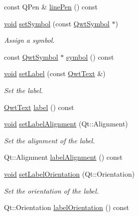 \begin{DoxyCompactItemize}
\item 
const Q\-Pen \& \hyperlink{class_qwt_plot_marker_a744b2aa104fa41d2f09c6658749c2d72}{line\-Pen} () const 
\item 
\hyperlink{group___u_a_v_objects_plugin_ga444cf2ff3f0ecbe028adce838d373f5c}{void} \hyperlink{class_qwt_plot_marker_af44231c2b63bb277706e4f515297c7b1}{set\-Symbol} (const \hyperlink{class_qwt_symbol}{Qwt\-Symbol} $\ast$)
\begin{DoxyCompactList}\small\item\em Assign a symbol. \end{DoxyCompactList}\item 
const \hyperlink{class_qwt_symbol}{Qwt\-Symbol} $\ast$ \hyperlink{class_qwt_plot_marker_ac3f7385b517bb8d7f0f572bfdecbc222}{symbol} () const 
\item 
\hyperlink{group___u_a_v_objects_plugin_ga444cf2ff3f0ecbe028adce838d373f5c}{void} \hyperlink{class_qwt_plot_marker_ad90adc27ccd6a10a7d6d1bb4464bf7d1}{set\-Label} (const \hyperlink{class_qwt_text}{Qwt\-Text} \&)
\begin{DoxyCompactList}\small\item\em Set the label. \end{DoxyCompactList}\item 
\hyperlink{class_qwt_text}{Qwt\-Text} \hyperlink{class_qwt_plot_marker_acf81c4a657fd772cf7c5387a19ab6793}{label} () const 
\item 
\hyperlink{group___u_a_v_objects_plugin_ga444cf2ff3f0ecbe028adce838d373f5c}{void} \hyperlink{class_qwt_plot_marker_ab0c88d103cc68093ac7469ad421105e0}{set\-Label\-Alignment} (Qt\-::\-Alignment)
\begin{DoxyCompactList}\small\item\em Set the alignment of the label. \end{DoxyCompactList}\item 
Qt\-::\-Alignment \hyperlink{class_qwt_plot_marker_a16415f05a235642e2b93df9e4685d68e}{label\-Alignment} () const 
\item 
\hyperlink{group___u_a_v_objects_plugin_ga444cf2ff3f0ecbe028adce838d373f5c}{void} \hyperlink{class_qwt_plot_marker_a2bd6a30b0b04bd2c07505e1cfcdd2561}{set\-Label\-Orientation} (Qt\-::\-Orientation)
\begin{DoxyCompactList}\small\item\em Set the orientation of the label. \end{DoxyCompactList}\item 
Qt\-::\-Orientation \hyperlink{class_qwt_plot_marker_ab3be191bccfa7e668cc2ae8303c43c18}{label\-Orientation} () const 

\end{DoxyCompactItemize}
